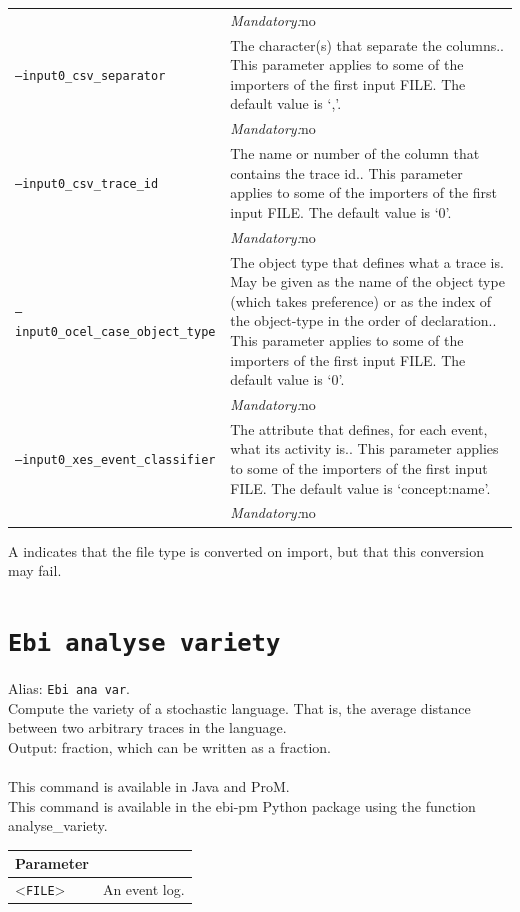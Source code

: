 {\begin{tabularx}{\linewidth}{lX}
&\textit{Mandatory:}\quad no\\
\texttt{--input0\_csv\_separator} & The character(s) that separate the columns.. This parameter applies to some of the importers of the first input FILE. The default value is `,'.\\
&\textit{Mandatory:}\quad no\\
\texttt{--input0\_csv\_trace\_id} & The name or number of the column that contains the trace id.. This parameter applies to some of the importers of the first input FILE. The default value is `0'.\\
&\textit{Mandatory:}\quad no\\
\texttt{--input0\_ocel\_case\_object\_type} & The object type that defines what a trace is. May be given as the name of the object type (which takes preference) or as the index of the object-type in the order of declaration.. This parameter applies to some of the importers of the first input FILE. The default value is `0'.\\
&\textit{Mandatory:}\quad no\\
\texttt{--input0\_xes\_event\_classifier} & The attribute that defines, for each event, what its activity is.. This parameter applies to some of the importers of the first input FILE. The default value is `concept:name'.\\
&\textit{Mandatory:}\quad no\\
\bottomrule
\end{tabularx}
A \textdagger{} indicates that the file type is converted on import, but that this conversion may fail.
\clearpage\section{\texttt{Ebi analyse variety}}
\label{command:Ebi analyse variety}
Alias: \texttt{Ebi ana var}.\\
Compute the variety of a stochastic language. That is, the average distance between two arbitrary traces in the language.\\
\noindent Output: fraction, which can be written as a fraction.\\
\\This command is available in Java and ProM.
\\This command is available in the ebi-pm Python package using the function analyse\_variety.
\begin{tabularx}{\linewidth}{lX}
\toprule
Parameter \\\midrule
<\texttt{FILE}>&An event log.\\

\end{tabularx}}
